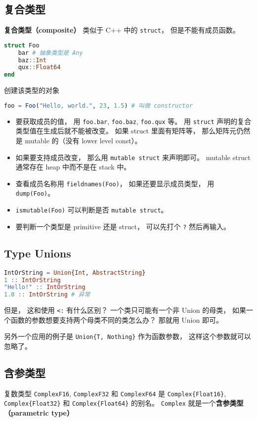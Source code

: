 \subsection{复合类型}
\textbf{复合类型（composite）} 类似于 C++ 中的 \verb|struct|， 但是不能有成员函数。
\begin{lstlisting}[language=julia]
struct Foo
    bar # 抽象类型是 Any
    baz::Int
    qux::Float64
end
\end{lstlisting}
创建该类型的对象
\begin{lstlisting}[language=julia]
foo = Foo("Hello, world.", 23, 1.5) # 叫做 constructor
\end{lstlisting}
\begin{itemize}
\item 要获取成员的值， 用 \verb|foo.bar|, \verb|foo.baz|, \verb|foo.qux| 等。 用 \verb|struct| 声明的复合类型值在生成后就不能被改变。 如果 struct 里面有矩阵等， 那么矩阵元仍然是 mutable 的（没有 lower level const）。
\item 如果要支持成员改变， 那么用 \verb|mutable struct| 来声明即可。 mutable struct 通常存在 heap 中而不是在 stack 中。
\item 查看成员名称用 \verb|fieldnames(Foo)|， 如果还要显示成员类型， 用 \verb|dump(Foo)|。
\item \verb|ismutable(Foo)| 可以判断是否 \verb|mutable struct|。
\item 要判断一个类型是 primitive 还是 struct， 可以先打个 \verb|?| 然后再输入。
\end{itemize}

\subsection{Type Unions}
\begin{lstlisting}[language=julia]
IntOrString = Union{Int, AbstractString}
1 :: IntOrString
"Hello!" :: IntOrString
1.0 :: IntOrString # 异常
\end{lstlisting}
但是， 这和使用 \verb|<:| 有什么区别？ 一个类只可能有一个非 Union 的母类， 如果一个函数的参数想要支持两个母类不同的类怎么办？ 那就用 Union 即可。

另外一个应用的例子是 \verb|Union{T, Nothing}| 作为函数参数， 这样这个参数就可以忽略了。

\subsection{含参类型}

复数类型 \verb|ComplexF16|, \verb|ComplexF32| 和 \verb|ComplexF64| 是 \verb|Complex{Float16}|, \verb|Complex{Float32}| 和 \verb|Complex{Float64}| 的别名。 \verb|Complex| 就是一个\textbf{含参类型（parametric type）}

